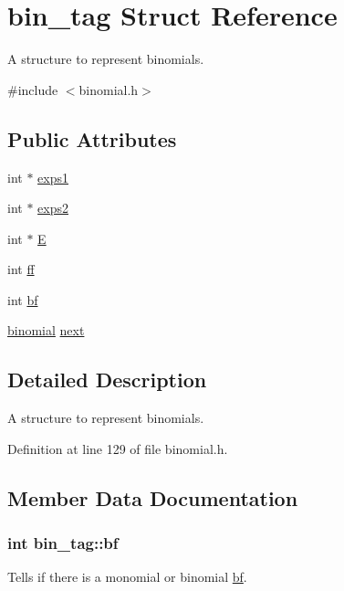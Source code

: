 \hypertarget{structbin__tag}{\section{bin\-\_\-tag Struct Reference}
\label{structbin__tag}
}


A structure to represent binomials.  




{\ttfamily \#include $<$binomial.\-h$>$}

\subsection*{Public Attributes}
\begin{DoxyCompactItemize}
\item 
int $\ast$ \hyperlink{structbin__tag_a24714f76bda2e3822def9064310b9f5d}{exps1}
\item 
int $\ast$ \hyperlink{structbin__tag_a3e916a57631abe0bfd2774953956c2b4}{exps2}
\item 
int $\ast$ \hyperlink{structbin__tag_a89efbcb4dffe5122a3ab5b201b026aa4}{E}
\item 
int \hyperlink{structbin__tag_a8c2bf8adf54a9ff4c784837a16f5f171}{ff}
\item 
int \hyperlink{structbin__tag_ab9323a5f6435f8d4f36f085aa90d00a9}{bf}
\item 
\hyperlink{binomial_8h_a805580ea35b5ac9d25526fb2d3131738}{binomial} \hyperlink{structbin__tag_a980eb5c7885afd0a14c4f30db7272c4e}{next}
\end{DoxyCompactItemize}


\subsection{Detailed Description}
A structure to represent binomials. 

Definition at line 129 of file binomial.\-h.



\subsection{Member Data Documentation}
\hypertarget{structbin__tag_ab9323a5f6435f8d4f36f085aa90d00a9}{
\subsubsection[{bf}]{\setlength{\rightskip}{0pt plus 5cm}int bin\-\_\-tag\-::bf}}\label{structbin__tag_ab9323a5f6435f8d4f36f085aa90d00a9}
Tells if there is a monomial or binomial \hyperlink{structbin__tag_ab9323a5f6435f8d4f36f085aa90d00a9}{bf}. 


